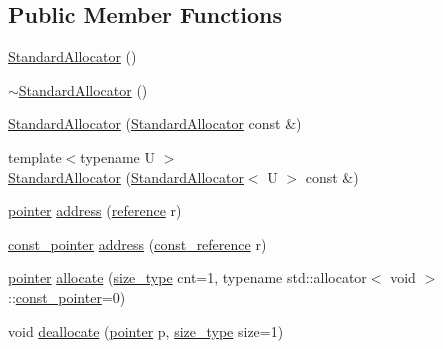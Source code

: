 \subsection*{Public Member Functions}
\begin{DoxyCompactItemize}
\item 
\hyperlink{classcrap_1_1memory_1_1_standard_allocator_a47f2e643c8116e4ef1e5d76547aeb090}{Standard\-Allocator} ()
\item 
\hyperlink{classcrap_1_1memory_1_1_standard_allocator_a367f9d4c09d327aec6a50772eb0cac09}{$\sim$\-Standard\-Allocator} ()
\item 
\hyperlink{classcrap_1_1memory_1_1_standard_allocator_a4b15e0dbd75fe743bb1fb2bab99f8739}{Standard\-Allocator} (\hyperlink{classcrap_1_1memory_1_1_standard_allocator}{Standard\-Allocator} const \&)
\item 
{\footnotesize template$<$typename U $>$ }\\\hyperlink{classcrap_1_1memory_1_1_standard_allocator_acdd7869c5f7ad1785a5791b7a4778bc2}{Standard\-Allocator} (\hyperlink{classcrap_1_1memory_1_1_standard_allocator}{Standard\-Allocator}$<$ U $>$ const \&)
\item 
\hyperlink{classcrap_1_1memory_1_1_standard_allocator_a92221f3975cb89b59eaa308e8a470c6d}{pointer} \hyperlink{classcrap_1_1memory_1_1_standard_allocator_ade25df23b8f0b6670e8bebe4ab680657}{address} (\hyperlink{classcrap_1_1memory_1_1_standard_allocator_ad4f01aad766fa81a29635512e8096f47}{reference} r)
\item 
\hyperlink{classcrap_1_1memory_1_1_standard_allocator_aa04b0d1d61d571ec3e7845038fd39144}{const\-\_\-pointer} \hyperlink{classcrap_1_1memory_1_1_standard_allocator_a8698c9a4163ea4e6d7c9ce7d4ad7dec8}{address} (\hyperlink{classcrap_1_1memory_1_1_standard_allocator_a465f96f36f9ae046e9af1a0b15d9ae91}{const\-\_\-reference} r)
\item 
\hyperlink{classcrap_1_1memory_1_1_standard_allocator_a92221f3975cb89b59eaa308e8a470c6d}{pointer} \hyperlink{classcrap_1_1memory_1_1_standard_allocator_a8111679d18df7678041337ec38303dc6}{allocate} (\hyperlink{classcrap_1_1memory_1_1_standard_allocator_a647535d0ddf782ac9cf2d77c6a63aa59}{size\-\_\-type} cnt=1, typename std\-::allocator$<$ void $>$\-::\hyperlink{classcrap_1_1memory_1_1_standard_allocator_aa04b0d1d61d571ec3e7845038fd39144}{const\-\_\-pointer}=0)
\item 
void \hyperlink{classcrap_1_1memory_1_1_standard_allocator_aea61945d5531cc714b7138f8436429d8}{deallocate} (\hyperlink{classcrap_1_1memory_1_1_standard_allocator_a92221f3975cb89b59eaa308e8a470c6d}{pointer} p, \hyperlink{classcrap_1_1memory_1_1_standard_allocator_a647535d0ddf782ac9cf2d77c6a63aa59}{size\-\_\-type} size=1)

\end{DoxyCompactItemize}
